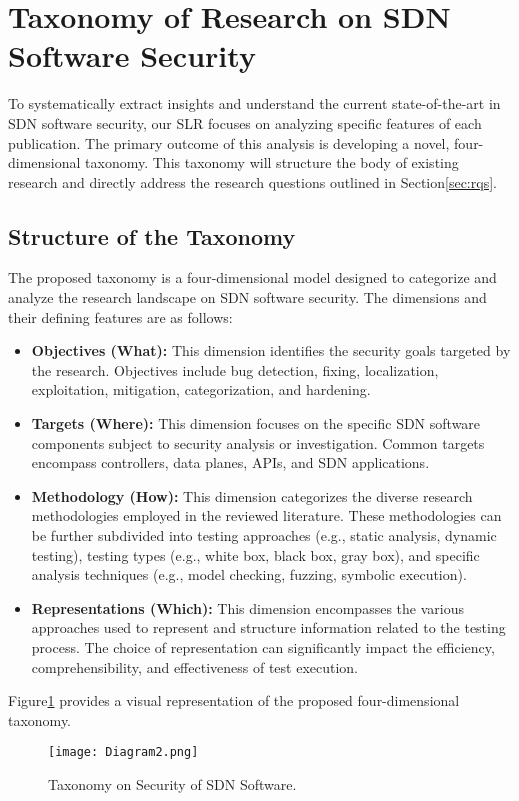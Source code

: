 \section{Taxonomy of Research on SDN Software Security}\label{sec:tx}
To systematically extract insights and understand the current state-of-the-art in SDN software security, our SLR focuses on analyzing specific features of each publication. The primary outcome of this analysis is developing a novel, four-dimensional taxonomy. This taxonomy will structure the body of existing research and directly address the research questions outlined in Section\ref{sec:rqs}.
\subsection{Structure of the Taxonomy}
The proposed taxonomy is a four-dimensional model designed to categorize and analyze the research landscape on SDN software security. The dimensions and their defining features are as follows:
\begin{itemize}
    \item \textbf{Objectives (What):} This dimension identifies the security goals targeted by the research. Objectives include bug detection, fixing, localization, exploitation, mitigation, categorization, and hardening.
    \item \textbf{Targets (Where):} This dimension focuses on the specific SDN software components subject to security analysis or investigation. Common targets encompass controllers, data planes, APIs, and SDN applications.
    \item \textbf{Methodology (How):}  This dimension categorizes the diverse research methodologies employed in the reviewed literature. These methodologies can be further subdivided into testing approaches (e.g., static analysis, dynamic testing), testing types (e.g., white box, black box, gray box), and specific analysis techniques (e.g., model checking, fuzzing, symbolic execution).
    \item \textbf{Representations (Which):} This dimension encompasses the various approaches used to represent and structure information related to the testing process. The choice of representation can significantly impact the efficiency, comprehensibility, and effectiveness of test execution.
\end{itemize}
Figure\ref{fig_txn} provides a visual representation of the proposed four-dimensional taxonomy.
\begin{figure}[ht!]
\centering
\begin{adjustbox}{width=\linewidth, center}
\texttt{[image: Diagram2.png]}
\end{adjustbox}
\caption{Taxonomy on Security of SDN Software.}
\label{fig_txn}
\end{figure}





